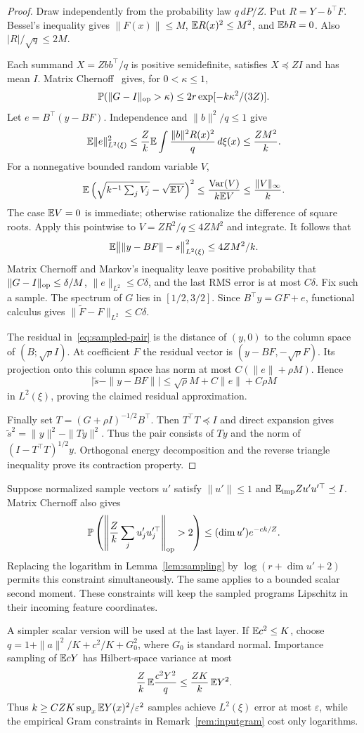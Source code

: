 \begin{proof}
Draw independently from the probability law $q\,dP/Z$. Put $R=Y-b^\top F$. Bessel's inequality gives $\|F(x)\|\le M$, $\mathbb E R(x)^2\le M^2$, and $\mathbb E bR=0$. Also $|R|/\sqrt q\le2M$.

Each summand $X=Zbb^\top/q$ is positive semidefinite, satisfies $X\preceq ZI$ and has mean $I$. Matrix Chernoff~\cite{tropp} gives, for $0<\kappa\le1$,
\[
 \mathbb P(\|G-I\|_{\mathrm{op}}>\kappa)\le2r\exp[-k\kappa^2/(3Z)].
\]
Let $e=B^\top(y-BF)$. Independence and $\|b\|^2/q\le1$ give
\[
 \mathbb E\|e\|_{L^2(\xi)}^2
 \le \frac Zk\mathbb E\int\frac{\|b\|^2R(x)^2}{q}\,d\xi(x)
 \le \frac{ZM^2}k.
\]
For a nonnegative bounded random variable $V$,
\[
 \mathbb E\left(\sqrt{k^{-1}\textstyle\sum_j V_j}-\sqrt{\mathbb E V}\right)^2
 \le\frac{\operatorname{Var}(V)}{k\mathbb E V}
 \le\frac{\|V\|_\infty}{k}.
\]
The case $\mathbb E V=0$ is immediate; otherwise rationalize the difference of square roots. Apply this pointwise to $V=ZR^2/q\le4ZM^2$ and integrate. It follows that
\[
 \mathbb E\big\|\|y-BF\|-s\big\|_{L^2(\xi)}^2\le4ZM^2/k.
\]
Matrix Chernoff and Markov's inequality leave positive probability that
$\|G-I\|_{\mathrm{op}}\le\delta/M$, $\|e\|_{L^2}\le C\delta$, and the last RMS error is at most $C\delta$. Fix such a sample. The spectrum of $G$ lies in $[1/2,3/2]$. Since $B^\top y=GF+e$, functional calculus gives $\|\widetilde F-F\|_{L^2}\le C\delta$.

The residual in~\eqref{eq:sampled-pair} is the distance of $(y,0)$ to the column space of $(B;\sqrt\rho I)$. At coefficient $F$ the residual vector is $(y-BF,-\sqrt\rho F)$. Its projection onto this column space has norm at most
$C(\|e\|+\rho M)$. Hence
\[
 \big|\widetilde s-\|y-BF\|\big|
 \le\sqrt\rho M+C\|e\|+C\rho M
\]
in $L^2(\xi)$, proving the claimed residual approximation.

Finally set $T=(G+\rho I)^{-1/2}B^\top$. Then $T^\top T\preceq I$ and direct expansion gives
$\widetilde s^2=\|y\|^2-\|Ty\|^2$. Thus the pair consists of $Ty$ and the norm of $(I-T^\top T)^{1/2}y$. Orthogonal energy decomposition and the reverse triangle inequality prove its contraction property.
\end{proof}

\begin{remark}
\label{rem:inputgram}
Suppose normalized sample vectors $u'$ satisfy $\|u'\|\le1$ and
$\mathbb E_{\rm imp}Zu'u'^\top\preceq I$. Matrix Chernoff also gives
\[
 \mathbb P\left(\left\|\frac Zk\sum_j u'_ju_j'^\top\right\|_{\mathrm{op}}>2\right)
 \le(\dim u')e^{-ck/Z}.
\]
Replacing the logarithm in Lemma~\ref{lem:sampling} by
$\log(r+\dim u'+2)$ permits this constraint simultaneously. The same applies to a bounded scalar second moment. These constraints will keep the sampled programs Lipschitz in their incoming feature coordinates.
\end{remark}

A simpler scalar version will be used at the last layer. If $\mathbb E c^2\le K$, choose
$q=1+\|a\|^2/K+c^2/K+G_0^2$, where $G_0$ is standard normal. Importance sampling of $\mathbb E cY$ has Hilbert-space variance at most
\[
 \frac Zk\,\mathbb E\frac{c^2Y^2}{q}\le\frac{ZK}k\,\mathbb E Y^2.
 \label{eq:scalar-variance}
\]
Thus $k\ge CZK\sup_x\mathbb E Y(x)^2/\varepsilon^2$ samples achieve $L^2(\xi)$ error at most $\varepsilon$, while the empirical Gram constraints in Remark~\ref{rem:inputgram} cost only logarithms.
